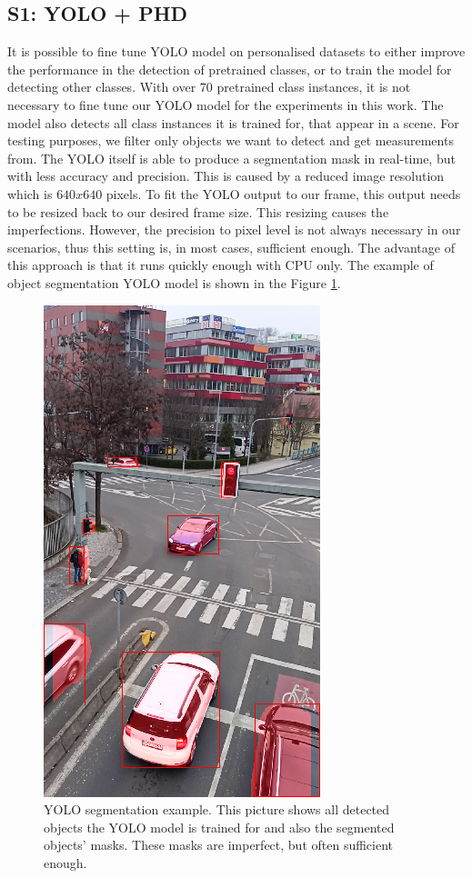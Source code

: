 \subsection{S1: YOLO + PHD}
It is possible to fine tune YOLO model on personalised datasets to either improve the performance in the
detection of
pretrained classes, or to train the model for detecting other classes. With over 70 pretrained class instances, it is
not necessary to fine tune our YOLO model for the experiments in this work. The model also detects all class
instances it is trained for, that appear in a scene. For testing purposes, we filter only objects we want to detect
and get
measurements from. The YOLO itself is able to produce a segmentation mask in real-time, but with less
accuracy
and
precision. This is caused by a reduced image resolution which is $640x640$ pixels. To fit the YOLO output
to our
frame,
this output needs to be resized back to our desired frame size. This resizing causes the imperfections. However, the
precision
to pixel level is not always necessary in our scenarios, thus this setting is, in most cases, sufficient
enough. The advantage of this approach is that it runs quickly enough with CPU only. The example of
object segmentation YOLO model is shown in the Figure \ref{fig:yolo_seg}.
\begin{figure}[h]
  \centering
  \includegraphics[width=0.35\linewidth]{text/chapter_04/imgs/YOLO_screenshot_2}
  \caption{YOLO segmentation example. This picture shows all detected objects the YOLO model is trained for and also
  the segmented objects' masks. These masks are imperfect, but often sufficient enough.}
  \label{fig:yolo_seg}
\end{figure}

